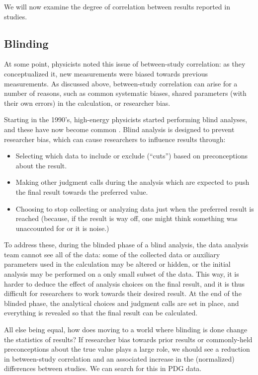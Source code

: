 \documentclass[12pt]{article}
\begin{document}
We will now examine the degree of correlation between results reported in studies. 

\subsection{Blinding}

At some point, physicists noted this issue of between-study correlation: as they conceptualized it, new measurements were biased towards previous measurements. As discussed above, between-study correlation can arise for a number of reasons, such as common systematic biases, shared parameters (with their own errors) in the calculation, or researcher bias.

Starting in the 1990's, high-energy physicists started performing blind analyses, and these have now become common \citep{klein2005blind}. Blind analysis is designed to prevent researcher bias, which can cause researchers to influence results through:
\begin{itemize}
  \item Selecting which data to include or exclude (``cuts'') based on preconceptions about the result.
  \item Making other judgment calls during the analysis which are expected to push the final result towards the preferred value.
  \item Choosing to stop collecting or analyzing data just when the preferred result is reached (because, if the result is way off, one might think something was unaccounted for or it is noise.)
\end{itemize}
To address these, during the blinded phase of a blind analysis, the data analysis team cannot see all of the data: some of the collected data or auxiliary parameters used in the calculation may be altered or hidden, or the initial analysis may be performed on a only small subset of the data. This way, it is harder to deduce the effect of analysis choices on the final result, and it is thus difficult for researchers to work towards their desired result. At the end of the blinded phase, the analytical choices and judgment calls are set in place, and everything is revealed so that the final result can be calculated.

All else being equal, how does moving to a world where blinding is done change the statistics of results? If researcher bias towards prior results or commonly-held preconceptions about the true value plays a large role, we should see a reduction in between-study correlation and an associated increase in the (normalized) differences between studies. We can search for this in PDG data.
\end{document}
